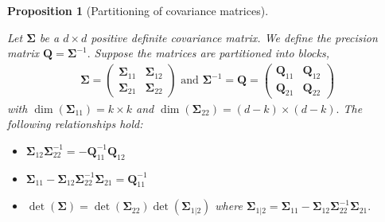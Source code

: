\documentclass[
  11pt,
  letterpaper,
]{scrbook}
\providecommand{\tightlist}{%
  \setlength{\itemsep}{0pt}\setlength{\parskip}{0pt}}
\theoremstyle{definition}
\theoremstyle{plain}
\newtheorem{proposition}{Proposition}[chapter]
\theoremstyle{plain}
\theoremstyle{plain}
\theoremstyle{definition}
\theoremstyle{definition}
\theoremstyle{plain}
\newtheorem{proposition}{Proposition}[chapter]
\theoremstyle{plain}
\theoremstyle{remark}
\begin{document}
\begin{proposition}[Partitioning of covariance
matrices]\protect\hypertarget{prp-partition-matrix}{}\label{prp-partition-matrix}

Let \(\boldsymbol{\Sigma}\) be a \(d \times d\) positive definite
covariance matrix. We define the precision matrix
\(\boldsymbol{Q} = \boldsymbol{\Sigma}^{-1}.\) Suppose the matrices are
partitioned into blocks, \begin{align*}
\boldsymbol{\Sigma}= 
\begin{pmatrix}
\boldsymbol{\Sigma}_{11} & \boldsymbol{\Sigma}_{12} \\
\boldsymbol{\Sigma}_{21} & \boldsymbol{\Sigma}_{22}
\end{pmatrix} \text{ and }
\boldsymbol{\Sigma}^{-1}= \boldsymbol{Q} = 
\begin{pmatrix} 
\boldsymbol{Q}_{11} &\boldsymbol{Q}_{12}
\\ \boldsymbol{Q}_{21} & \boldsymbol{Q}_{22}
\end{pmatrix}
\end{align*} with \(\dim(\boldsymbol{\Sigma}_{11})=k\times k\) and
\(\dim(\boldsymbol{\Sigma}_{22})=(d-k) \times (d-k).\) The following
relationships hold:

\begin{itemize}
\tightlist
\item
  \(\boldsymbol{\Sigma}_{12}\boldsymbol{\Sigma}_{22}^{-1}=-\boldsymbol{Q}_{11}^{-1}\boldsymbol{Q}_{12}\)
\item
  \(\boldsymbol{\Sigma}_{11}-\boldsymbol{\Sigma}_{12}\boldsymbol{\Sigma}_{22}^{-1}\boldsymbol{\Sigma}_{21}=\boldsymbol{Q}_{11}^{-1}\)
\item
  \(\det(\boldsymbol{\Sigma})=\det(\boldsymbol{\Sigma}_{22})\det(\boldsymbol{\Sigma}_{1|2})\)
  where
  \(\boldsymbol{\Sigma}_{1|2}=\boldsymbol{\Sigma}_{11}-\boldsymbol{\Sigma}_{12}\boldsymbol{\Sigma}_{22}^{-1}\boldsymbol{\Sigma}_{21}.\)
\end{itemize}

\end{proposition}
\end{document}
